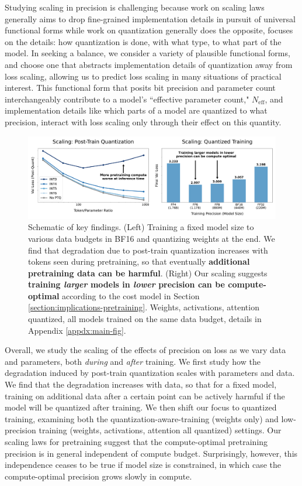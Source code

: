 \documentclass[11pt]{article}
\begin{document}
Studying scaling in precision is challenging because work on scaling laws generally aims to drop fine-grained implementation details in pursuit of universal functional forms while work on quantization generally does the opposite, focuses on the details: how quantization is done, with what type, to what part of the model. In seeking a balance, we consider a variety of plausible functional forms, and choose one that abstracts implementation details of quantization away from loss scaling, allowing us to predict loss scaling in many situations of practical interest. This functional form that posits bit precision and parameter count interchangeably contribute to a model's ``effective parameter count," $N_\text{eff}$, and implementation details like which parts of a model are quantized to what precision, interact with loss scaling only through their effect on this quantity. 

\begin{figure}[t] %
    \centering
    \includegraphics[width=\linewidth]{test_fig1_new_evals.pdf} %
    \caption{ Schematic of key findings. (Left) Training a fixed model size to various data budgets in BF16 and quantizing weights at the end. We find that degradation due to post-train quantization increases with tokens seen during pretraining, so that eventually \textbf{additional pretraining data can be harmful}. (Right) Our scaling suggests\textbf{ training \textit{larger} models in \textit{lower} precision can be compute-optimal} according to the cost model in Section \ref{section:implications-pretraining}. Weights, activations, attention quantized, all models trained on the same data budget, details in Appendix \ref{appdx:main-fig}.
    }
    \label{fig:main_figures}
\end{figure}

Overall, we study the scaling of the effects of precision on loss as we vary data and parameters, both \textit{during} and \textit{after} training. We first study how the degradation induced by post-train quantization scales with parameters and data. We find that the degradation increases with data, so that for a fixed model, training on additional data after a certain point can be actively harmful if the model will be quantized after training. We then shift our focus to quantized training, examining both the quantization-aware-training (weights only) and low-precision training (weights, activations, attention all quantized) settings. Our scaling laws for pretraining suggest that the compute-optimal pretraining precision is in general independent of compute budget. Surprisingly, however, this independence ceases to be true if model size is constrained, in which case the compute-optimal precision grows slowly in compute. 
\end{document}
